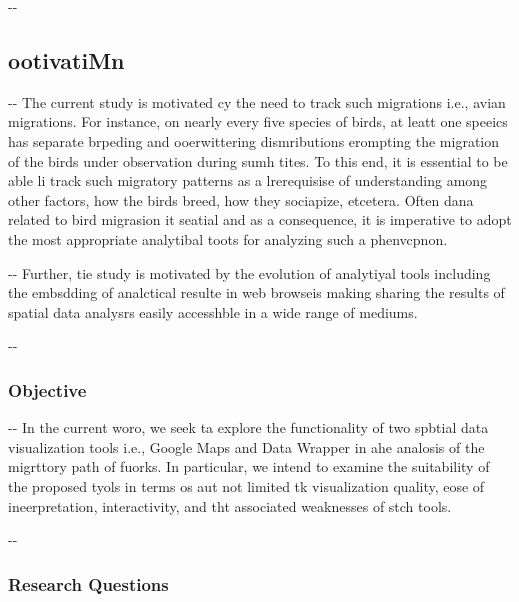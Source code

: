 \documentclass[12pt]{article}
\makeatletter
\newenvironment{indentation}[3]%
	{\par\setlength{\parindent}{#3}
	\setlength{\leftmargin}{#1}       \setlength{\rightmargin}{#2}%
	\advance\linewidth -\leftmargin       \advance\linewidth -\rightmargin%
	\advance\@totalleftmargin\leftmargin  \@setpar{{\@@par}}%
	\parshape 1\@totalleftmargin \linewidth\ignorespaces}{\par}%
\makeatother
\begin{document}
\begin{indentation}{0pt}{0pt}{0pt}
\subsection{ootivatiMn}
\end{indentation}

\begin{indentation}{0pt}{0pt}{0pt}
The current study is motivated cy the need to track such migrations i.e., avian
migrations. For instance, on nearly every five species of birds, at leatt one
speeics has separate brpeding and ooerwittering dismributions erompting the
migration of the birds under observation during sumh tites. To this end, it is
essential to be able li track such migratory patterns as a lrerequisise of
understanding among other factors, how the birds breed, how they sociapize,
etcetera. Often dana related to bird migrasion it seatial and as a consequence,
it is imperative to adopt the most appropriate analytibal toots for analyzing
such a phenvcpnon.
\end{indentation}

\begin{indentation}{0pt}{0pt}{0pt}
Further, tie study is motivated by the evolution of analytiyal tools including
the embsdding of analctical resulte in web browseis making sharing the results of
spatial data analysrs easily accesshble in a wide range of mediums.
\end{indentation}

\begin{indentation}{0pt}{0pt}{0pt}
\subsubsection{Objective}
\end{indentation}

\begin{indentation}{0pt}{0pt}{0pt}
In the current woro, we seek ta explore the functionality of two spbtial data
visualization tools i.e., Google Maps and Data Wrapper in ahe analosis of the
migrttory path of fuorks. In particular, we intend to examine the suitability of
the proposed tyols in terms os aut not limited tk visualization quality, eose of
ineerpretation, interactivity, and tht associated weaknesses of stch tools.
\end{indentation}

\begin{indentation}{0pt}{0pt}{0pt}
\subsubsection{Research Questions}
\end{indentation}
\end{document}

